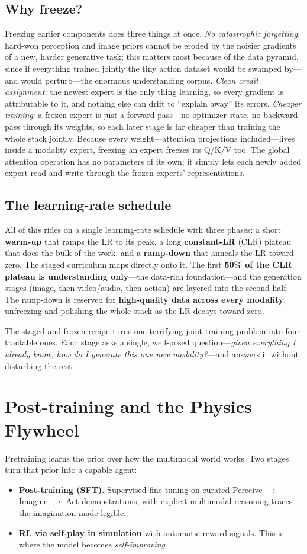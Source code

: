 \documentclass[10pt,conference]{IEEEtran}
\begin{document}
\subsection{Why freeze?}
Freezing earlier components does three things at once. \emph{No catastrophic
forgetting}: hard-won perception and image priors cannot be eroded by the noisier
gradients of a new, harder generative task; this matters most because of the data
pyramid, since if everything trained jointly the tiny action dataset would be
swamped by---and would perturb---the enormous understanding corpus. \emph{Clean
credit assignment}: the newest expert is the only thing learning, so every
gradient is attributable to it, and nothing else can drift to ``explain away''
its errors. \emph{Cheaper training}: a frozen expert is just a forward pass---no
optimizer state, no backward pass through its weights, so each later stage is far
cheaper than training the whole stack jointly. Because every weight---attention
projections included---lives inside a modality expert, freezing an expert freezes
its Q/K/V too. The global attention operation has no parameters of its own; it
simply lets each newly added expert read and write through the frozen experts'
representations.

\subsection{The learning-rate schedule}
All of this rides on a single learning-rate schedule with three phases: a short
\textbf{warm-up} that ramps the LR to its peak, a long \textbf{constant-LR} (CLR)
plateau that does the bulk of the work, and a \textbf{ramp-down} that anneals the
LR toward zero. The staged curriculum maps directly onto it. The first \textbf{50\%
of the CLR plateau is understanding only}---the data-rich foundation---and the
generation stages (image, then video/audio, then action) are layered into the
second half. The ramp-down is reserved for \textbf{high-quality data across every
modality}, unfreezing and polishing the whole stack as the LR decays toward zero.

The staged-and-frozen recipe turns one terrifying joint-training problem into
four tractable ones. Each stage asks a single, well-posed question---\emph{given
everything I already know, how do I generate this one new modality?}---and answers
it without disturbing the rest.

\section{Post-training and the Physics Flywheel}
Pretraining learns the prior over how the multimodal world works. Two stages turn
that prior into a capable agent:
\begin{itemize}
\item \textbf{Post-training (SFT).} Supervised fine-tuning on curated Perceive
$\rightarrow$ Imagine $\rightarrow$ Act demonstrations, with explicit multimodal
reasoning traces---the imagination made legible.
\item \textbf{RL via self-play in simulation} with automatic reward signals. This
is where the model becomes \emph{self-improving}.
\end{itemize}
\end{document}
